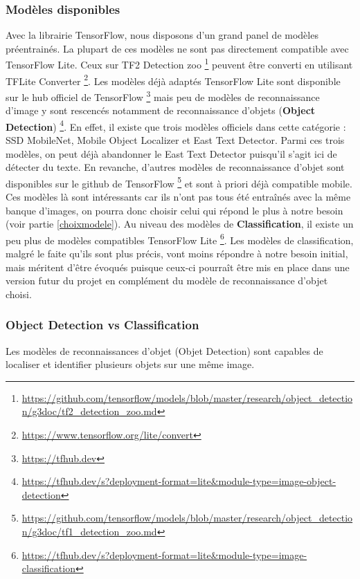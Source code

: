 \documentclass[UTF8]{EPURapport}
\begin{document}
\subsubsection{Modèles disponibles}
Avec la librairie TensorFlow, nous disposons d'un grand panel de modèles préentrainés. La plupart de ces modèles ne sont pas directement compatible avec TensorFlow Lite. Ceux sur TF2 Detection zoo \footnote{\url{https://github.com/tensorflow/models/blob/master/research/object_detection/g3doc/tf2_detection_zoo.md}} peuvent être converti en utilisant TFLite Converter \footnote{\url{https://www.tensorflow.org/lite/convert}}. Les modèles déjà adaptés TensorFlow Lite sont disponible sur le hub officiel de TensorFlow \footnote{\url{https://tfhub.dev}} mais peu de modèles de reconnaissance d'image y sont rescencés notamment de reconnaissance d'objets (\textbf{Object Detection}) \footnote{\url{https://tfhub.dev/s?deployment-format=lite&module-type=image-object-detection}}. En effet, il existe que trois modèles officiels dans cette catégorie : SSD MobileNet, Mobile Object Localizer et East Text Detector. Parmi ces trois modèles, on peut déjà abandonner le East Text Detector puisqu'il s'agit ici de détecter du texte. En revanche, d'autres modèles de reconnaissance d'objet sont disponibles sur le github de TensorFlow \footnote{\url{https://github.com/tensorflow/models/blob/master/research/object_detection/g3doc/tf1_detection_zoo.md}} et sont à priori déjà compatible mobile. Ces modèles là sont intéressants car ils n'ont pas tous été entraînés avec la même banque d'images, on pourra donc choisir celui qui répond le plus à notre besoin (voir partie \ref{choixmodele}). Au niveau des modèles de \textbf{Classification}, il existe un peu plus de modèles compatibles TensorFlow Lite \footnote{\url{https://tfhub.dev/s?deployment-format=lite&module-type=image-classification}}. Les modèles de classification, malgré le faite qu'ils sont plus précis, vont moins répondre à notre besoin initial, mais méritent d'être évoqués puisque ceux-ci pourraît être mis en place dans une version futur du projet en complément du modèle de reconnaissance d'objet choisi.

\subsubsection{Object Detection vs Classification}
Les modèles de reconnaissances d'objet (Objet Detection) sont capables de localiser et identifier plusieurs objets sur une même image.
\end{document}
